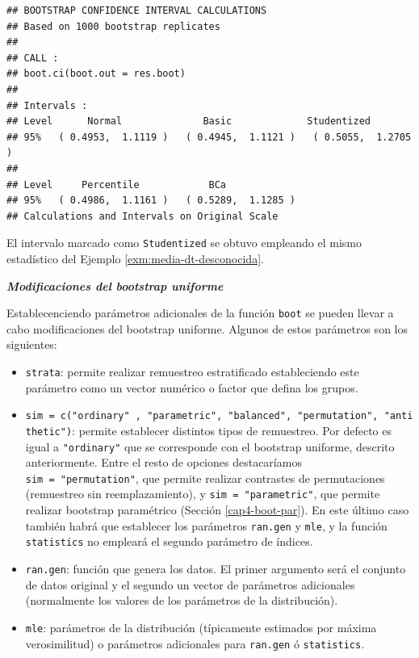 \documentclass[]{book}
\theoremstyle{definition}
\theoremstyle{definition}
\theoremstyle{definition}
\theoremstyle{remark}
\begin{document}
\begin{verbatim}
## BOOTSTRAP CONFIDENCE INTERVAL CALCULATIONS
## Based on 1000 bootstrap replicates
## 
## CALL : 
## boot.ci(boot.out = res.boot)
## 
## Intervals : 
## Level      Normal              Basic             Studentized     
## 95%   ( 0.4953,  1.1119 )   ( 0.4945,  1.1121 )   ( 0.5055,  1.2705 )  
## 
## Level     Percentile            BCa          
## 95%   ( 0.4986,  1.1161 )   ( 0.5289,  1.1285 )  
## Calculations and Intervals on Original Scale
\end{verbatim}

El intervalo marcado como \texttt{Studentized} se obtuvo empleando el
mismo estadístico del Ejemplo \ref{exm:media-dt-desconocida}.

\textbf{\emph{Modificaciones del bootstrap uniforme}}

Establecenciendo parámetros adicionales de la función \texttt{boot} se
pueden llevar a cabo modificaciones del bootstrap uniforme. Algunos de
estos parámetros son los siguientes:

\begin{itemize}
\item
  \texttt{strata}: permite realizar remuestreo estratificado
  estableciendo este parámetro como un vector numérico o factor que
  defina los grupos.
\item
  \texttt{sim\ =\ c("ordinary"\ ,\ "parametric",\ "balanced",\ "permutation",\ "antithetic")}:
  permite establecer distintos tipos de remuestreo. Por defecto es igual
  a \texttt{"ordinary"} que se corresponde con el bootstrap uniforme,
  descrito anteriormente. Entre el resto de opciones destacaríamos
  \texttt{sim\ =\ "permutation"}, que permite realizar contrastes de
  permutaciones (remuestreo sin reemplazamiento), y
  \texttt{sim\ =\ "parametric"}, que permite realizar bootstrap
  paramétrico (Sección \ref{cap4-boot-par}). En este último caso también
  habrá que establecer los parámetros \texttt{ran.gen} y \texttt{mle}, y
  la función \texttt{statistics} no empleará el segundo parámetro de
  índices.
\item
  \texttt{ran.gen}: función que genera los datos. El primer argumento
  será el conjunto de datos original y el segundo un vector de
  parámetros adicionales (normalmente los valores de los parámetros de
  la distribución).
\item
  \texttt{mle}: parámetros de la distribución (típicamente estimados por
  máxima verosimilitud) o parámetros adicionales para \texttt{ran.gen} ó
  \texttt{statistics}.
\end{itemize}
\end{document}
